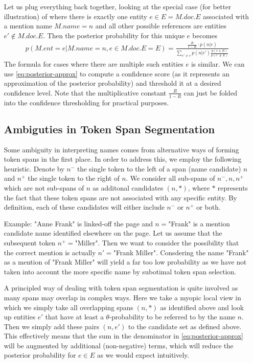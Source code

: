 \documentclass{article}
\begin{document}
Let us plug everything back together, looking at the special case (for better illustration) of where there is exactly one entity $e \in E = M.doc.E$ associated with a mention name $M.name=n$ and all other possible references are entities $e' \not\in M.doc.E$. Then the posterior probability for this unique $e$ becomes
\begin{align}
p(M.ent=e | M.name=n, e\in M.doc.E=E) =  \frac{\frac R{1-R} \cdot p(n|e)}{\sum_{e' \neq e} p(n|e') \frac{p(e \in E)}{p(e' \not\in E)}}
\label{eq:posterior-approx}
\end{align}
The formula for cases where there are multiple such entities $e$ is similar. We can use \eqref{eq:posterior-approx} to compute a confidence score (as it represents an approximation of the posterior probability) and threshold it at a desired confidence level. Note that the multiplicative constant $\frac{R}{1-R}$ can just be folded into the confidence thresholding for practical purposes. 

\subsection*{Ambiguties in Token Span Segmentation}

Some ambiguity in interpreting names comes from alternative ways of forming token spans in the first place. In order to address this, we employ the following heuristic. Denote by $n^-$ the single token to the left of a span (name candidate) $n$ and $n^+$ the single token to the right of $n$. We consider all sub-spans of $n^-,n,n^+$ which are not sub-spans of $n$ as additonal candidates $(n,*)$, where $*$ represents the fact that these token spans are not associated with any specific entity. By definition, each of these candidates will either include $n^-$ or $n^+$ or both. 

 Example: "Anne Frank" is linked-off the page and $n=$"Frank" is a mention candidate name identified elsewhere on the page. Let us assume that the subsequent token $n^+=$"Miller". Then we want to consider the possibility that the correct mention is actually $n'=$"Frank Miller". Consdering the name "Frank" as a mention of "Frank Miller" will yield a far too low probability as we have not taken into account the more specific name by subotimal token span selection. 
 
A principled way of dealing with token span segmentation is quite involved as many spans may overlap in complex ways. Here we take a myopic local view in which we simply take all overlapping spans $(n,*)$ as identified above and look up entities $e'$ that have at least a $\theta$-probability to be referred to by the name $n$. Then we simply add these pairs $(n,e')$ to the candidate set as defined above. This effectively means that the sum in the denominator in \eqref{eq:posterior-approx} will be augmented by additional (non-negative) terms, which will reduce the posterior probability for $e \in E$ as we would expect intuitively.  
 
\end{document}
